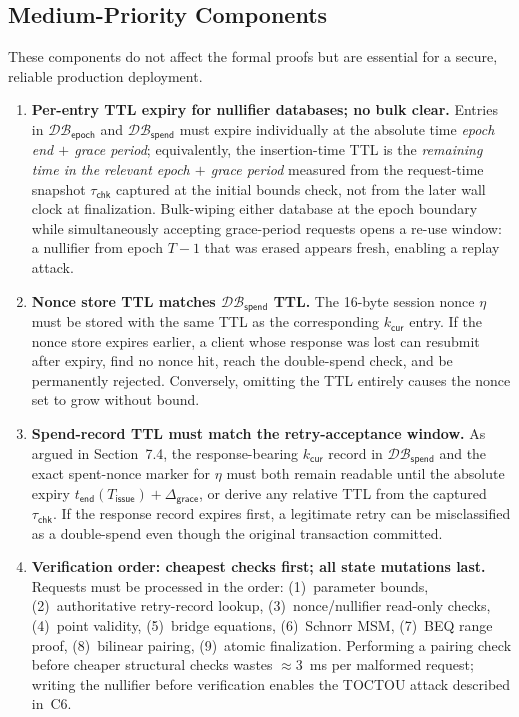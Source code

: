 \documentclass[11pt]{article}
\theoremstyle{definitionstyle}
\theoremstyle{plain}
\newcommand{\DB}{\mathcal{DB}}
\begin{document}
\subsection{Medium-Priority Components}
\label{sec:medium}

These components do not affect the formal proofs but are essential for a
secure, reliable production deployment.

\begin{enumerate}[leftmargin=*,label=\textbf{M\arabic*.}]

\item \textbf{Per-entry TTL expiry for nullifier databases; no bulk clear.}
  Entries in $\DB_{\mathsf{epoch}}$ and $\DB_{\mathsf{spend}}$ must expire
  individually at the absolute time \emph{epoch end $+$ grace period};
  equivalently, the insertion-time TTL is the \emph{remaining time in the
  relevant epoch $+$ grace period} measured from the request-time snapshot
  $\tau_{\mathsf{chk}}$ captured at the initial bounds check, not from the
  later wall clock at finalization.
  Bulk-wiping either database at the epoch boundary while simultaneously
  accepting grace-period requests opens a re-use window: a nullifier from
  epoch $T-1$ that was erased appears fresh, enabling a replay attack.

\item \textbf{Nonce store TTL matches $\DB_{\mathsf{spend}}$ TTL.}
  The 16-byte session nonce $\eta$ must be stored with the same TTL as the
  corresponding $k_{\mathsf{cur}}$ entry.  If the nonce store expires earlier,
  a client whose response was lost can resubmit after expiry, find no nonce
  hit, reach the double-spend check, and be permanently rejected.  Conversely,
  omitting the TTL entirely causes the nonce set to grow without bound.

\item \textbf{Spend-record TTL must match the retry-acceptance window.}
  As argued in Section~7.4, the response-bearing $k_{\mathsf{cur}}$ record in
  $\DB_{\mathsf{spend}}$ and the exact spent-nonce marker for $\eta$ must both
  remain readable until the absolute expiry $t_{\mathsf{end}}(T_{\mathsf{issue}})
  + \Delta_{\mathsf{grace}}$, or derive any relative TTL from the captured
  $\tau_{\mathsf{chk}}$.  If the response
  record expires first, a legitimate retry can be misclassified as a
  double-spend even though the original transaction committed.

\item \textbf{Verification order: cheapest checks first; all state mutations last.}
  Requests must be processed in the order: (1)~parameter bounds,
  (2)~authoritative retry-record lookup, (3)~nonce/nullifier read-only checks, (4)~point
  validity, (5)~bridge equations, (6)~Schnorr MSM, (7)~BEQ range proof,
  (8)~bilinear pairing, (9)~atomic finalization.  Performing a pairing
  check before cheaper structural checks wastes $\approx 3$~ms per
  malformed request; writing the nullifier before verification enables the
  TOCTOU attack described in~C6.


\end{enumerate}
\end{document}
